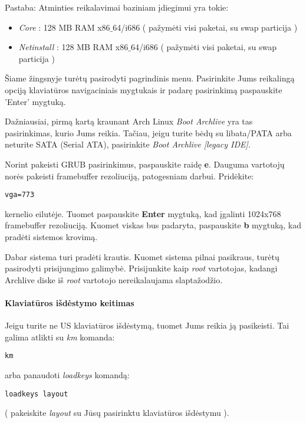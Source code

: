 \documentclass[a4paper]{book}
\begin{document}
  Pastaba: Atminties reikalavimai baziniam įdiegimui yra tokie:
  \begin{itemize}
    \item \textsl{Core} : 128 MB RAM x86$\_$64/i686 ( pažymėti visi
      paketai, su swap particija )
    \item \textsl{Netinstall} : 128 MB RAM x86$\_$64/i686 ( pažymėti
      visi paketai, su swap particija )
  \end{itemize}

  Šiame žingsnyje turėtų pasirodyti pagrindinis menu. Pasirinkite
  Jums reikalingą opciją klaviatūros navigaciniais mygtukais ir padarę
  pasirinkimą paspauskite 'Enter' mygtuką.

  Dažniausiai, pirmą kartą kraunant Arch Linux \textsl{Boot Archlive}
  yra tas pasirinkimas, kurio Jums reikia. Tačiau, jeigu turite bėdų
  su libata/PATA arba neturite SATA (Serial ATA), pasirinkite
  \textsl{Boot Archlive [legacy IDE]}.

  Norint pakeisti GRUB pasirinkimus, paspauskite raidę
  \textbf{e}. Dauguma vartotojų norės pakeisti framebuffer
  rezoliuciją, patogesniam darbui. Pridėkite:
  \begin{verbatim}
vga=773
  \end{verbatim}
  kernelio eilutėje. Tuomet paspauskite \textbf{Enter} mygtuką, kad
  įgalinti 1024x768 framebuffer rezoliuciją. Kuomet viskas bus
  padaryta, paspauskite \textbf{b} mygtuką, kad pradėti sistemos
  krovimą.

  Dabar sistema turi pradėti krautis. Kuomet sistema pilnai pasikraus,
  turėtų pasirodyti prisijungimo galimybė. Prisijunkite kaip
  \textsl{root} vartotojas, kadangi Archlive diske iš \textsl{root}
  vartotojo nereikalaujama slaptažodžio.

  \paragraph{Klaviatūros išdėstymo keitimas}

  Jeigu turite ne US klaviatūros išdėstymą, tuomet Jums reikia ją
  pasikeisti. Tai galima atlikti su \textsl{km} komanda:
  \begin{verbatim}
km
  \end{verbatim}
  arba panaudoti \textsl{loadkeys} komandą:
  \begin{verbatim}
loadkeys layout
  \end{verbatim}
  ( pakeiskite \textsl{layout} su Jūsų pasirinktu klaviatūros
  išdėstymu ).
\end{document}
